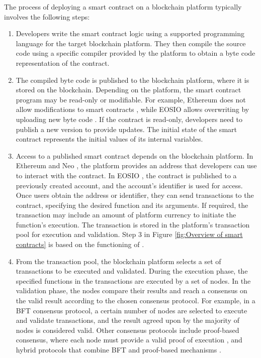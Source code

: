 The process of deploying a smart contract on a blockchain platform typically involves the following steps:

\begin{enumerate}
    \item Developers write the smart contract logic using a supported programming language for the target blockchain platform. They then compile the source code using a specific compiler provided by the platform to obtain a byte code representation of the contract.
    \item The compiled byte code is published to the blockchain platform, where it is stored on the blockchain. Depending on the platform, the smart contract program may be read-only or modifiable. For example, Ethereum does not allow modifications to smart contracts \cite{ethereum_whitepaper}, while EOSIO allows overwriting by uploading new byte code \cite{eosio_cleos}. If the contract is read-only, developers need to publish a new version to provide updates. The initial state of the smart contract represents the initial values of its internal variables.
    \item Access to a published smart contract depends on the blockchain platform. In Ethereum \cite{ethereum_whitepaper} and Neo \cite{neocontract_whitepaper}, the platform provides an address that developers can use to interact with the contract. In EOSIO \cite{eosio_api}, the contract is published to a previously created account, and the account's identifier is used for access. Once users obtain the address or identifier, they can send transactions to the contract, specifying the desired function and its arguments. If required, the transaction may include an amount of platform currency to initiate the function's execution. The transaction is stored in the platform's transaction pool for execution and validation.
    Step 3 in Figure \ref{fig:Overview of smart contracts} is based on the functioning
of \cite{ethereum_whitepaper}\cite{neocontract_whitepaper}.
    \item From the transaction pool, the blockchain platform selects a set of transactions to be executed and validated. During the execution phase, the specified functions in the transactions are executed by a set of nodes. In the validation phase, the nodes compare their results and reach a consensus on the valid result according to the chosen consensus protocol. For example, in a  \ac{BFT} \cite{pease_reaching_1980} consensus protocol, a certain number of nodes are selected to execute and validate transactions, and the result agreed upon by the majority of nodes is considered valid. Other consensus protocols include proof-based consensus, where each node must provide a valid proof of execution \cite{nguyen_survey_2018}, and hybrid protocols that combine \ac{BFT} and proof-based mechanisms \cite{pass_hybrid_2017}\cite{wu_hybrid_2020}.

\end{enumerate}
